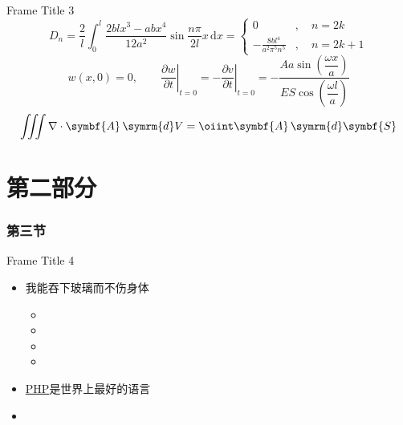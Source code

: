 \documentclass{beamer}
\begin{document}
\begin{frame}{Frame Title 3}
    \begin{equation}
    D_n = \frac{2}{l}\int_0^l\frac{2blx^3-abx^4}{12a^2}\sin\frac{n\pi}{2l}x \,\mathrm{d}x = \left\{
    \begin{aligned}
        0\qquad &,\quad n = 2k \\
        -\frac{8bl^4}{a^2 \pi^5 n^5}&,\quad n = 2k + 1
    \end{aligned}
    \right.
    \end{equation}
    \begin{equation}
    w(x,0) = 0,\qquad \left.\frac{\partial w}{\partial t}\right|_{t=0} = -\left.\frac{\partial v}{\partial t}\right|_{t=0} = -\frac{Aa\sin\left(\dfrac{\omega x}{a}\right)}{ES\cos\left(\dfrac{\omega l}{a}\right)}
    \end{equation}
    \begin{equation}
    \iiint \nabla\cdot\symbf{A}\,\symrm{d}V = \oiint \symbf{A}\,\symrm{d}\symbf{S}
    \end{equation}
\end{frame}

\part{第二部分}

\begin{frame}
    \partpage
    \tableofcontents
\end{frame}

\section{第三节}

\begin{frame}{Frame Title 4}
    \begin{itemize}
        \item 我能吞下玻璃而不伤身体
        \begin{itemize}
            \item[1.] 

            \item[2.] 

            \item[3.] 

            \item[4.] 
        \end{itemize}

        \item \href{https://www.php.net/}{PHP}是世界上最好的语言

        \item {}
    \end{itemize}
\end{frame}
\end{document}
